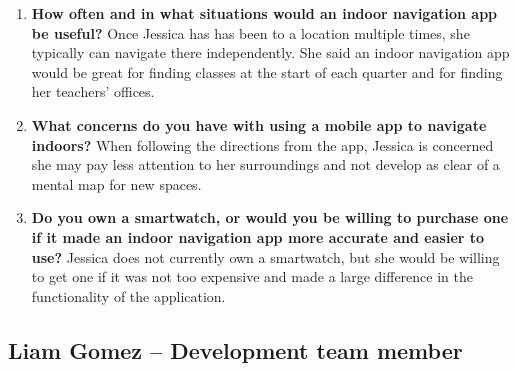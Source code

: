 \documentclass{scrreprt}
\begin{document}
\begin{enumerate}
\item \textbf{How often and in what situations would an indoor navigation app be useful?}
Once Jessica has has been to a location multiple times, she typically can navigate there independently. She said an indoor navigation app would be great for finding classes at the start of each quarter and for finding her teachers’ offices.
 
\item \textbf{What concerns do you have with using a mobile app to navigate indoors?}
When following the directions from the app, Jessica is concerned she may pay less attention to her surroundings and not develop as clear of a mental map for new spaces.

\pagebreak

\item \textbf{Do you own a smartwatch, or would you be willing to purchase one if it made an indoor navigation app more accurate and easier to use?}
Jessica does not currently own a smartwatch, but she would be willing to get one if it was not too expensive and made a large difference in the functionality of the application.
\end{enumerate}

\subsection{Liam Gomez – Development team member}
\end{document}
